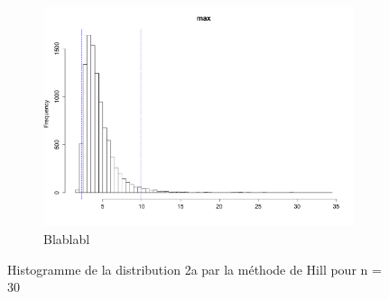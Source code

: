 \documentclass{article}
\renewcommand*{\(}{\left(}
\renewcommand*{\)}{\right)}
\begin{document}
\begin{figure}[H]
\begin{subfigure}[b]{0.3\textwidth}
        \includegraphics[width = \linewidth]{img/BootstrapAHill-Max-30.pdf}
        \caption{Blablabl}
        \label{fig:BAHMax}
    \end{subfigure}%
    \caption{Histogramme de la distribution 2a par la méthode de Hill pour n = 30}
    \label{fig:BAH}
\end{figure}
\end{document}
